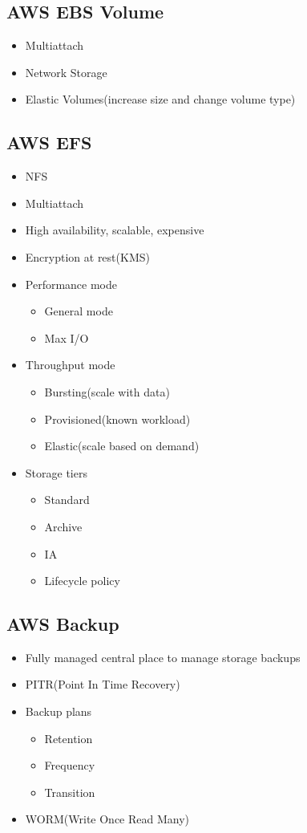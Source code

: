 \documentclass[../main.tex]{subfiles}
\begin{document}
\subsection{AWS EBS Volume}
\begin{itemize}
    \item Multiattach
    \item Network Storage
    \item Elastic Volumes(increase size and change volume type)
\end{itemize}

\subsection{AWS EFS}
\begin{itemize}
    \item NFS
    \item Multiattach
    \item High availability, scalable, expensive
    \item Encryption at rest(KMS)
    \item Performance mode
    \begin{itemize}
        \item General mode
        \item Max I/O
    \end{itemize}
    \item Throughput mode
    \begin{itemize}
        \item Bursting(scale with data)
        \item Provisioned(known workload)
        \item Elastic(scale based on demand)
    \end{itemize}
    \item Storage tiers
    \begin{itemize}
        \item Standard
        \item Archive
        \item IA
        \item Lifecycle policy
    \end{itemize}
\end{itemize}

\subsection{AWS Backup}
\begin{itemize}
    \item Fully managed central place to manage storage backups
    \item PITR(Point In Time Recovery)
    \item Backup plans
    \begin{itemize}
        \item Retention
        \item Frequency
        \item Transition
    \end{itemize}
    \item WORM(Write Once Read Many)
\end{itemize}
\end{document}
